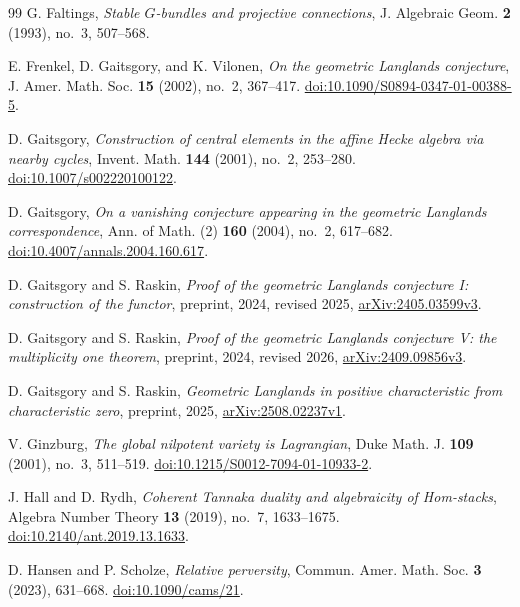 \begin{thebibliography}{99}
G. Faltings, \emph{Stable $G$-bundles and projective connections},
J. Algebraic Geom. \textbf{2} (1993), no.~3, 507--568.

E. Frenkel, D. Gaitsgory, and K. Vilonen, \emph{On the geometric
Langlands conjecture}, J. Amer. Math. Soc. \textbf{15} (2002), no.~2,
367--417.
\href{https://doi.org/10.1090/S0894-0347-01-00388-5}{doi:10.1090/S0894-0347-01-00388-5}.

D. Gaitsgory, \emph{Construction of central elements in the affine
Hecke algebra via nearby cycles}, Invent. Math. \textbf{144} (2001),
no.~2, 253--280.
\href{https://doi.org/10.1007/s002220100122}{doi:10.1007/s002220100122}.

D. Gaitsgory, \emph{On a vanishing conjecture appearing in the geometric
Langlands correspondence}, Ann. of Math. (2) \textbf{160} (2004), no.~2,
617--682.
\href{https://doi.org/10.4007/annals.2004.160.617}{doi:10.4007/annals.2004.160.617}.

D. Gaitsgory and S. Raskin, \emph{Proof of the geometric Langlands
conjecture I: construction of the functor}, preprint, 2024,
revised 2025,
\href{https://arxiv.org/abs/2405.03599v3}{arXiv:2405.03599v3}.

D. Gaitsgory and S. Raskin, \emph{Proof of the geometric Langlands
conjecture V: the multiplicity one theorem}, preprint, 2024,
revised 2026,
\href{https://arxiv.org/abs/2409.09856v3}{arXiv:2409.09856v3}.

D. Gaitsgory and S. Raskin, \emph{Geometric Langlands in positive
characteristic from characteristic zero}, preprint, 2025,
\href{https://arxiv.org/abs/2508.02237v1}{arXiv:2508.02237v1}.

V. Ginzburg, \emph{The global nilpotent variety is Lagrangian},
Duke Math. J. \textbf{109} (2001), no.~3, 511--519.
\href{https://doi.org/10.1215/S0012-7094-01-10933-2}{doi:10.1215/S0012-7094-01-10933-2}.

J. Hall and D. Rydh, \emph{Coherent Tannaka duality and algebraicity of
Hom-stacks}, Algebra Number Theory \textbf{13} (2019), no.~7, 1633--1675.
\href{https://doi.org/10.2140/ant.2019.13.1633}{doi:10.2140/ant.2019.13.1633}.

D. Hansen and P. Scholze, \emph{Relative perversity},
Commun. Amer. Math. Soc. \textbf{3} (2023), 631--668.
\href{https://doi.org/10.1090/cams/21}{doi:10.1090/cams/21}.


\end{thebibliography}
